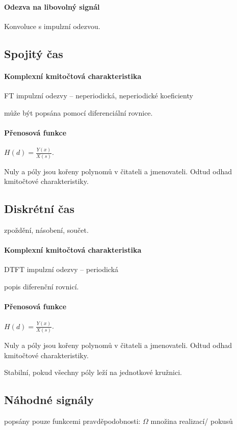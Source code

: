 \documentclass[a4paper, 11pt]{report}
\begin{document}
\paragraph{Odezva na libovolný signál}
Konvoluce s impulzní odezvou.

\subsection{Spojitý čas}

\paragraph{Komplexní kmitočtová charakteristika} FT impulzní odezvy -- neperiodická, neperiodické koeficienty

může být popsána pomocí diferenciální rovnice.

\paragraph{Přenosová funkce} $H(d) = \frac{Y(x)}{X(s)}$.

Nuly a póly jsou kořeny polynomů v čitateli a jmenovateli. Odtud odhad kmitočtové charakteristiky.

\subsection{Diskrétní čas}
zpoždění, násobení, součet.

\paragraph{Komplexní kmitočtová charakteristika} DTFT impulzní odezvy -- periodická

popis diferenční rovnicí.

\paragraph{Přenosová funkce} $H(d) = \frac{Y(x)}{X(s)}$.

Nuly a póly jsou kořeny polynomů v čitateli a jmenovateli. Odtud odhad kmitočtové charakteristiky.

Stabilní, pokud všechny póly leží na jednotkové kružnici.

\subsection{Náhodné signály}
popsány pouze funkcemi pravděpodobnosti: $\Omega$ množina realizací/ pokusů
\end{document}
